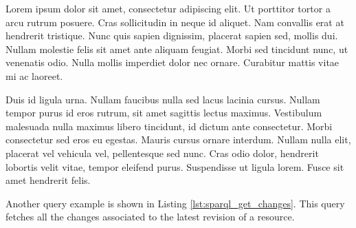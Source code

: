 Lorem ipsum dolor sit amet, consectetur adipiscing elit. Ut porttitor tortor a arcu rutrum posuere. Cras sollicitudin in neque id aliquet. Nam convallis erat at hendrerit tristique. Nunc quis sapien dignissim, placerat sapien sed, mollis dui. Nullam molestie felis sit amet ante aliquam feugiat. Morbi sed tincidunt nunc, ut venenatis odio. Nulla mollis imperdiet dolor nec ornare. Curabitur mattis vitae mi ac laoreet.

Duis id ligula urna. Nullam faucibus nulla sed lacus lacinia cursus. Nullam tempor purus id eros rutrum, sit amet sagittis lectus maximus. Vestibulum malesuada nulla maximus libero tincidunt, id dictum ante consectetur. Morbi consectetur sed eros eu egestas. Mauris cursus ornare interdum. Nullam nulla elit, placerat vel vehicula vel, pellentesque sed nunc. Cras odio dolor, hendrerit lobortis velit vitae, tempor eleifend purus. Suspendisse ut ligula lorem. Fusce sit amet hendrerit felis.

\begin{Code}

\end{Code}

Another query example is shown in Listing \ref{lst:sparql_get_changes}. This query fetches all the changes associated to the latest revision of a resource. 

\begin{Code}

\end{Code}


